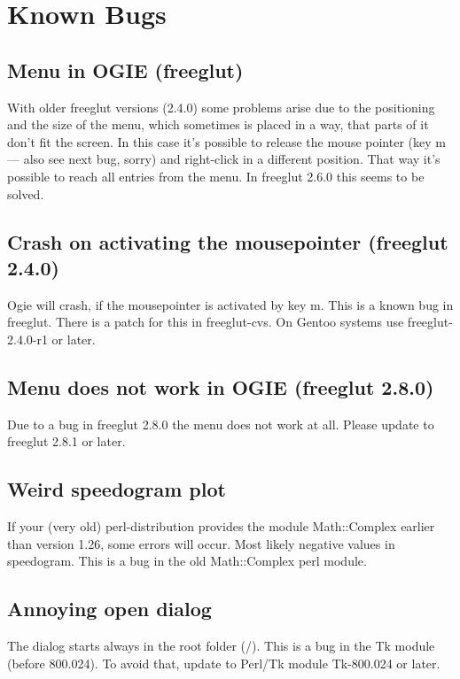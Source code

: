 \section{Known Bugs}
\label{bugs}


\subsection*{Menu in OGIE (freeglut)}
With older freeglut versions (2.4.0) some problems arise due to the positioning and the size of the
menu, which sometimes is placed in a way, that parts of it don't fit the screen.
In this case it's possible to release the mouse pointer (key m --- also see next bug, sorry) and right-click in a different position. That way it's possible to reach all entries from the menu.
In freeglut 2.6.0 this seems to be solved.

\subsection*{Crash on activating the mousepointer (freeglut 2.4.0)}
Ogie will crash, if the mousepointer is activated by key m. This is a known bug in freeglut.
There is a patch for this in freeglut-cvs. On Gentoo systems use freeglut-2.4.0-r1 or later.

\subsection*{Menu does not work in OGIE (freeglut 2.8.0)}
Due to a bug in freeglut 2.8.0 the menu does not work at all.
Please update to freeglut 2.8.1 or later.

\subsection*{Weird speedogram plot}
If your (very old) perl-distribution provides the module Math::Complex earlier
than version 1.26, some errors will occur. Most likely negative values in
speedogram. This is a bug in the old Math::Complex perl module.

\subsection*{Annoying open dialog}
The  dialog starts always in the root folder (/). This is  a bug in the
Tk module (before 800.024). To avoid that, update to Perl/Tk module Tk-800.024 or later.

